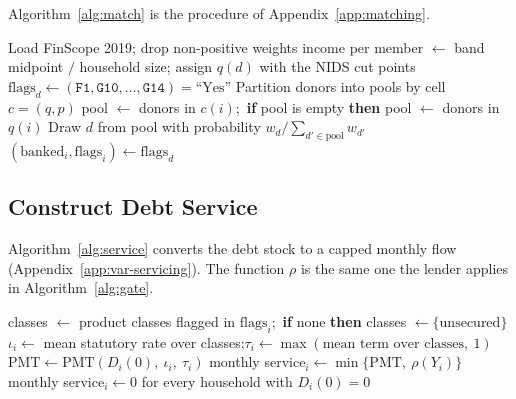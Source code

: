 Algorithm~\ref{alg:match} is the procedure of Appendix~\ref{app:matching}.

\begin{algorithm}[!htbp]
\caption{Cell-donor match}
\label{alg:match}
\begin{algorithmic}
\State Load \ac{FinScope} 2019; drop non-positive weights 
    \State income per member $\gets$ band midpoint $/$ household size; assign $q(d)$ with the \ac{NIDS} cut points
    \State $\text{flags}_d \gets (\texttt{F1}, \texttt{G10}, \ldots, \texttt{G14}) = \text{``Yes''}$
\EndFor
\State Partition donors into pools by cell $c = (q, p)$ 
    \State pool $\gets$ donors in $c(i)$;\ \textbf{if} pool is empty \textbf{then} pool $\gets$ donors in $q(i)$
    \State Draw $d$ from pool with probability $w_d / \sum_{d' \in \text{pool}} w_{d'}$
    \State $(\text{banked}_i, \text{flags}_i) \gets \text{flags}_d$ 
\EndFor
\end{algorithmic}
\end{algorithm}

\subsection{Construct Debt Service}\label{app:init-service}

Algorithm~\ref{alg:service} converts the debt stock to a capped monthly flow
(Appendix~\ref{app:var-servicing}). The function $\rho$ is the same one the lender applies
in Algorithm~\ref{alg:gate}.

\begin{algorithm}[!htbp]
\caption{Construct debt service}
\label{alg:service}
\begin{algorithmic}
    \State classes $\gets$ product classes flagged in $\text{flags}_i$;\ \textbf{if} none \textbf{then} classes $\gets \{\text{unsecured}\}$
    \State $\iota_i \gets$ mean statutory rate over classes;\quad $\tau_i \gets \max(\text{mean term over classes},\ 1)$
    \State $\text{PMT} \gets \mathrm{PMT}(D_i(0),\ \iota_i,\ \tau_i)$ 
    \State monthly service$_i \gets \min\{\text{PMT},\ \rho(Y_i)\}$ 
\EndFor
\State monthly service$_i \gets 0$ for every household with $D_i(0) = 0$
\end{algorithmic}
\end{algorithm}

